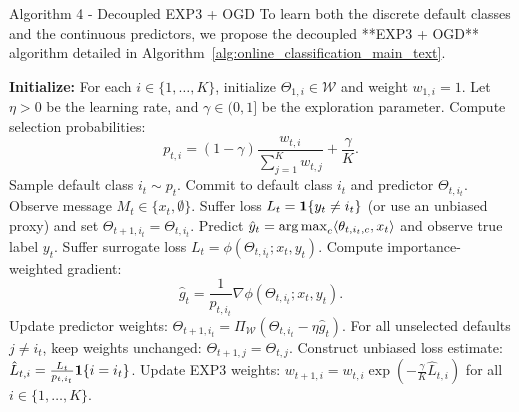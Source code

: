 \begin{sourceblock}{Algorithm 4 - Decoupled EXP3 + OGD}
To learn both the discrete default classes and the continuous predictors, we propose the decoupled **EXP3 + OGD** algorithm detailed in Algorithm~\ref{alg:online_classification_main_text}.

\begin{algorithm}[h]
\caption{Online Multiclass Classification with Strategic Withholding}
\label{alg:online_classification_main_text}
\begin{algorithmic}[1]
\State \textbf{Initialize:} For each $i \in \{1, \dots, K\}$, initialize $\Theta_{1,i} \in \mathcal{W}$ and weight $w_{1,i} = 1$. Let $\eta > 0$ be the learning rate, and $\gamma \in (0, 1]$ be the exploration parameter.
    \State Compute selection probabilities:
    \begin{equation*}
        p_{t,i} = (1-\gamma) \frac{w_{t,i}}{\sum_{j=1}^K w_{t,j}} + \frac{\gamma}{K}.
    \end{equation*}
    \State Sample default class $i_t \sim p_{t}$.
    \State Commit to default class $i_t$ and predictor $\Theta_{t, i_t}$.
    \State Observe message $M_t \in \{x_t, \emptyset\}$.
        \State Suffer loss $L_t = \mathbf{1}\{y_t \ne i_t\}$ (or use an unbiased proxy) and set $\Theta_{t+1, i_t} = \Theta_{t, i_t}$.
    \Else
        \State Predict $\hat{y}_t = \operatorname*{arg\,max}_c \langle \theta_{t,i_t, c}, x_t \rangle$ and observe true label $y_t$.
        \State Suffer surrogate loss $L_t = \phi(\Theta_{t, i_t}; x_t, y_t)$.
        \State Compute importance-weighted gradient:
        \begin{equation*}
            \hat{g}_t = \frac{1}{p_{t, i_t}} \nabla \phi(\Theta_{t, i_t}; x_t, y_t).
        \end{equation*}
        \State Update predictor weights: $\Theta_{t+1, i_t} = \Pi_{\mathcal{W}}\left( \Theta_{t, i_t} - \eta \hat{g}_t \right)$.
    \EndIf
    \State For all unselected defaults $j \ne i_t$, keep weights unchanged: $\Theta_{t+1, j} = \Theta_{t, j}$.
    \State Construct unbiased loss estimate: $\hat{L}_{t, i} = \frac{L_t}{p_{t, i_t}} \mathbf{1}\{i = i_t\}$.
    \State Update EXP3 weights: $w_{t+1, i} = w_{t, i} \exp\left(-\frac{\gamma}{K} \hat{L}_{t, i}\right)$ for all $i \in \{1, \dots, K\}$.
\EndFor
\end{algorithmic}
\end{algorithm}
\end{sourceblock}

\begin{faqblock}
\faqanswers
{}
\end{faqblock}

